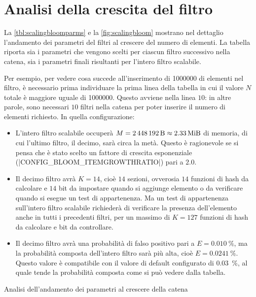 \section{Analisi della crescita del filtro}

La \autoref{tbl:scalingbloomparms} e la \autoref{fig:scalingbloom} mostrano nel dettaglio
l'andamento dei parametri del filtri al crescere del numero di elementi. La tabella riporta sia i
parametri che vengono scelti per ciascun filtro successivo nella catena, sia i parametri finali
risultanti per l'intero filtro scalabile.

Per esempio, per vedere cosa succede all'inserimento di \num{1000000} di elementi nel filtro,
è necessario prima individuare la prima linea della tabella in cui il valore $N$ totale è maggiore
uguale di \num{1000000}. Questo avviene nella linea $10$: in altre parole, sono necessari $10$
filtri nella catena per poter inserire il numero di elementi richiesto. In quella configurazione:

\medskip
\begin{itemize}
  \item L'intero filtro scalabile occuperà $M = \SI{2448192}{\byte} \approx \SI{2.33}{\mebi\byte}$
  di memoria, di cui l'ultimo filtro, il decimo, sarà circa la metà. Questo è ragionevole se si
  pensa che è stato scelto un fattore di crescita esponenziale (\cverb|CONFIG_BLOOM_ITEMGROWTHRATIO|)
  pari a $2.0$.

  \item Il decimo filtro avrà $K=14$, cioè $14$ sezioni, ovverosia $14$ funzioni di hash da
  calcolare e $14$ bit da impostare quando si aggiunge elemento o da verificare quando si esegue un
  test di appartenenza. Ma un test di appartenenza sull'intero filtro scalabile richiederà di
  verificare la presenza dell'elemento anche in tutti i precedenti filtri, per un massimo di $K=127$
  funzioni di hash da calcolare e bit da controllare.

  \item Il decimo filtro avrà una probabilità di falso positivo pari a $E = \SI{0.010}{\%}$, ma la
  probabilità composta dell'intero filtro sarà più alta, cioè $E = \SI{0.0241}{\%}$. Questo valore è
  compatibile con il valore di default configurato di \SI{0.03}{\%}, al quale tende la probabilità
  composta come si può vedere dalla tabella.
\end{itemize}

\begin{table}[htb]
  \resizebox{\textwidth}{!}{%
  }
  \caption[margin=-10pt]{Analisi dell'andamento dei parametri al crescere della catena}
  \label{tbl:scalingbloomparms}
\end{table}

